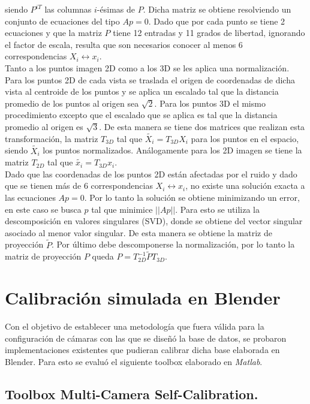  siendo $P^{iT}$ las columnas $i$-ésimas de $P$. Dicha matriz se obtiene resolviendo un conjunto de ecuaciones del tipo $Ap=0$.  Dado que por cada punto se tiene 2 ecuaciones y que la matriz $P$ tiene 12 entradas y 11 grados de libertad, ignorando el factor de escala, resulta que son necesarios conocer al menos 6 correspondencias $X_i \leftrightarrow x_i$.\\
 
 Tanto a los puntos imagen 2D como a los 3D se les aplica una normalización. Para los puntos 2D de cada vista se traslada el origen de coordenadas de dicha vista al centroide de los puntos y se aplica un escalado tal que la distancia promedio de los puntos al origen sea $\sqrt{2}$. Para los puntos 3D el mismo procedimiento excepto que el escalado que se aplica es tal que la distancia promedio al origen es $\sqrt{3}$. De esta manera se tiene dos matrices que realizan esta transformación, la matriz $T_{3D}$ tal que $\tilde{X_i} = T_{3D}^{}X_i$ para los puntos en el espacio, siendo $\tilde{X_i}$ los puntos normalizados. Análogamente para los 2D imagen se tiene la matriz $T_{2D}^{}$ tal que $\tilde{x_i} = T_{3D}^{}x_i$. \\
 
 Dado que las coordenadas de los puntos 2D están afectadas por el ruido y dado que se tienen más de 6 correspondencias $X_i \leftrightarrow x_i$, no existe una solución exacta a las ecuaciones $Ap=0$. Por lo tanto la solución se obtiene minimizando un error, en este caso se busca $p$ tal que minimice $||Ap||$. Para esto se utiliza la descomposición en valores singulares (SVD), donde se obtiene del vector singular asociado al menor valor singular. De esta manera se obtiene la matriz de proyección $\tilde{P}$. Por último debe descomponerse la normalización, por lo tanto la matriz de proyección $P$ queda $P = T_{2D}^{-1} \tilde{P} T_{3D}^{}$.
 
 \section{Calibración simulada en Blender}
 
 Con el objetivo de establecer una metodología que fuera válida para la configuración de cámaras con las que se diseñó la base de datos, se probaron implementaciones existentes que pudieran calibrar dicha base elaborada en Blender. Para esto se evaluó el siguiente toolbox elaborado en \emph{Matlab}.\\ 
 
  \subsection{Toolbox Multi-Camera Self-Calibration.} 
 
